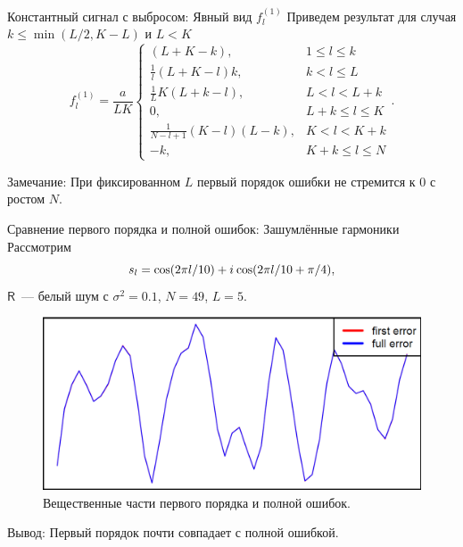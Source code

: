 \documentclass[ucs, notheorems, handout]{beamer}
\newcommand{\tX}[1]{\mathsf{#1}}
\newcommand{\iu}{{i\mkern1mu}}
\begin{document}
\begin{frame}{Константный сигнал с выбросом: Явный вид $f^{(1)}_l$}
    Приведем результат для случая $k \leq \min(L/2, K - L)$ и $L < K$
$$f^{(1)}_l = \frac{a}{{LK}}
\begin{cases}
	(L + K - k), & \text{$1 \leq l \leq k$}\\
	\frac{1}{l}(L + K - l)k, & \text{$k < l \leq L$}\\
	\frac{1}{L}K(L + k - l), &\text{$L < l < L + k$}\\
	0, &\text{$L + k \leq l \leq K$}\\
	\frac{1}{N - l + 1}(K - l)(L - k), &\text{$K < l < K + k$}\\
	-k, &\text{$K + k \leq l \leq N $}
\end{cases}.$$

\alert{Замечание:} При фиксированном $L$ первый порядок ошибки не стремится к $0$ с ростом $N$.
\end{frame}

\begin{frame}{Сравнение первого порядка и полной ошибок: Зашумлённые гармоники}
Рассмотрим
$$s_l = \cos(2 \pi l / 10) + \iu\cos(2 \pi l / 10 + \pi/4),$$
$\tX{R}$~--- белый шум с $\sigma^2 = 0.1$, $N = 49$, $L = 5$.
\begin{figure}[H]
	\begin{center}
		\includegraphics[width=0.6\linewidth]{first_vs_full_re.png}
		\caption{Вещественные части первого порядка и полной ошибок.}
		\label{fig:harm_noise}
	\end{center}
\end{figure}
\alert{Вывод:} Первый порядок почти совпадает с полной ошибкой.
\end{frame}
\end{document}
